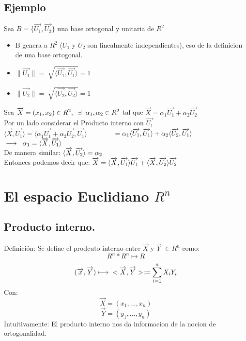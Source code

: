 \documentclass{book}
\begin{document}
\subsection*{Ejemplo}
Sea $B=\{\overrightarrow{U_{1}},\overrightarrow{U_{2}}\}$ una base ortogonal y unitaria de $R^2$
\begin{itemize}
    \item B genera a $R^2$ ($U_{1}$ y $U_{2}$ son linealmente independientes), eso de la definicion de una base ortogonal.
    \item $\|\overrightarrow{U_{1}}\|=\sqrt[]{\langle \overrightarrow{U_{1}},\overrightarrow{U_{1}}\rangle}=1$
    \item $\|\overrightarrow{U_{2}}\|=\sqrt[]{\langle \overrightarrow{U_{2}},\overrightarrow{U_{2}}\rangle}=1$
\end{itemize}
Sea $\overrightarrow{X}=(x_{1},x_{2}) \in R^2, \hspace*{0.2cm}\exists \hspace*{0.2cm}\alpha_{1},\alpha_{2}\in R^2$ tal que $\overrightarrow{X}=\alpha_{1}\overrightarrow{U_{1}}+\alpha_{2}\overrightarrow{U_{2}}$
\\Por un lado considerar el Producto interno con $\overrightarrow{U_{1}}$
\\$\langle\overrightarrow{X},\overrightarrow{U_{1}}\rangle=\langle\alpha_{1}\overrightarrow{U_{1}}+\alpha_{2}\overrightarrow{U_{2}},\overrightarrow{U_{1}}\rangle$
$\\\hspace*{1.2cm}=\alpha_{1}\langle\overrightarrow{U_{1}},\overrightarrow{U_{1}}\rangle+\alpha_{2}\langle\overrightarrow{U_{2}},\overrightarrow{U_{1}}\rangle$
$\\\longrightarrow\hspace*{0.2cm}\alpha_{1}=\langle\overrightarrow{X},\overrightarrow{U_{1}}\rangle$
\\De manera similar:
$\\\langle\overrightarrow{X},\overrightarrow{U_{2}}\rangle=\alpha_{2}$
\\Entonces podemos decir que:
$\\\overrightarrow{X}=\langle\overrightarrow{X},\overrightarrow{U_{1}}\rangle\overrightarrow{U_{1}}+\langle\overrightarrow{X},\overrightarrow{U_{2}}\rangle\overrightarrow{U_{2}}$
\section*{El espacio Euclidiano $R^n$}
\subsection*{Producto interno.}
Definición: Se define el prodcuto interno entre $\overrightarrow{X}$ y $\overrightarrow{Y}$ $\in R^n$ como:
$$R^n*R^n\longmapsto R$$
$$(\overrightarrow{x},\overrightarrow{Y})\longmapsto\hspace*{0.2cm}<\overrightarrow{X},\overrightarrow{Y}>:=\sum_{i=1}^{n}X_{i}Y_{i}$$
Con:
$$\overrightarrow{X}=(x_{1},...,x_{n})$$
$$\overrightarrow{Y}=(y_{1},...,y_{n})$$
Intuitivamente: El producto interno nos da informacion de la nocion de ortogonalidad.
\end{document}
